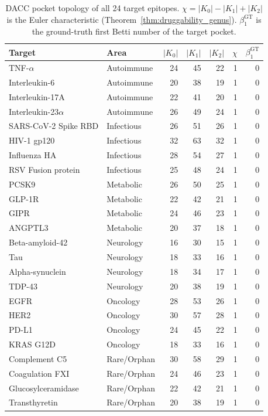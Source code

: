 \begin{table}[h!]
\centering
\small
\renewcommand{\arraystretch}{1.15}
\begin{tabular}{@{} l l r r r r r @{}}
\toprule
\textbf{Target} & \textbf{Area} & $|K_0|$ & $|K_1|$ & $|K_2|$ & $\chi$ & $\beta_1^{\text{GT}}$ \\
\midrule
TNF-$\alpha$ & Autoimmune & 24 & 45 & 22 & 1 & 0 \\
Interleukin-6 & Autoimmune & 20 & 38 & 19 & 1 & 0 \\
Interleukin-17A & Autoimmune & 22 & 41 & 20 & 1 & 0 \\
Interleukin-23$\alpha$ & Autoimmune & 26 & 49 & 24 & 1 & 0 \\
\midrule
SARS-CoV-2 Spike RBD & Infectious & 26 & 51 & 26 & 1 & 0 \\
HIV-1 gp120 & Infectious & 32 & 63 & 32 & 1 & 0 \\
Influenza HA & Infectious & 28 & 54 & 27 & 1 & 0 \\
RSV Fusion protein & Infectious & 25 & 48 & 24 & 1 & 0 \\
\midrule
PCSK9 & Metabolic & 26 & 50 & 25 & 1 & 0 \\
GLP-1R & Metabolic & 22 & 42 & 21 & 1 & 0 \\
GIPR & Metabolic & 24 & 46 & 23 & 1 & 0 \\
ANGPTL3 & Metabolic & 20 & 37 & 18 & 1 & 0 \\
\midrule
Beta-amyloid-42 & Neurology & 16 & 30 & 15 & 1 & 0 \\
Tau & Neurology & 18 & 33 & 16 & 1 & 0 \\
Alpha-synuclein & Neurology & 18 & 34 & 17 & 1 & 0 \\
TDP-43 & Neurology & 20 & 38 & 19 & 1 & 0 \\
\midrule
EGFR & Oncology & 28 & 53 & 26 & 1 & 0 \\
HER2 & Oncology & 30 & 57 & 28 & 1 & 0 \\
PD-L1 & Oncology & 24 & 45 & 22 & 1 & 0 \\
KRAS G12D & Oncology & 18 & 33 & 16 & 1 & 0 \\
\midrule
Complement C5 & Rare/Orphan & 30 & 58 & 29 & 1 & 0 \\
Coagulation FXI & Rare/Orphan & 24 & 46 & 23 & 1 & 0 \\
Glucosylceramidase & Rare/Orphan & 22 & 42 & 21 & 1 & 0 \\
Transthyretin & Rare/Orphan & 20 & 38 & 19 & 1 & 0 \\
\bottomrule
\end{tabular}
\caption{DACC pocket topology of all 24 target epitopes.
         $\chi = |K_0| - |K_1| + |K_2|$ is the Euler characteristic
         (Theorem~\ref{thm:druggability_genus}). $\beta_1^{\text{GT}}$
         is the ground-truth first Betti number of the target pocket.}
\label{tbl:targets_full}
\end{table}

